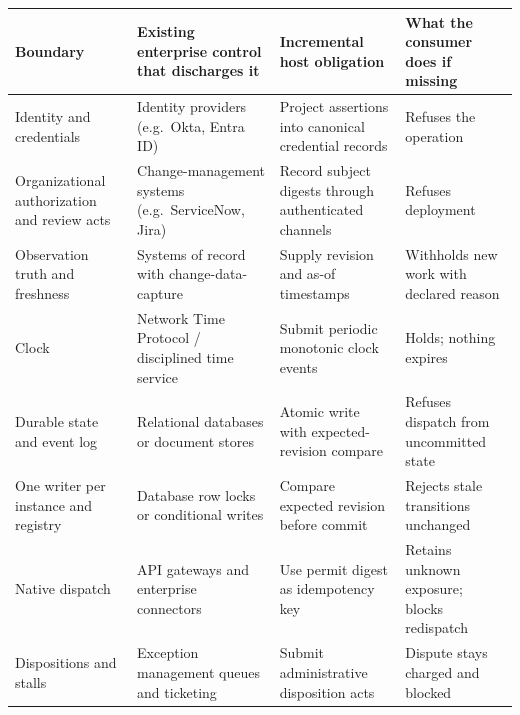 \documentclass[
  american,
  11pt,
  letterpaper,
]{article}
\newcounter{none} %
\begin{document}
{\def\LTcaptype{none} %
\begin{longtable}[]{@{}
  >{\raggedright\arraybackslash}p{}
  >{\raggedright\arraybackslash}p{}
  >{\raggedright\arraybackslash}p{}
  >{\raggedright\arraybackslash}p{}@{}}
\toprule\noalign{}
\begin{minipage}[b]{\linewidth}\raggedright
Boundary
\end{minipage} & \begin{minipage}[b]{\linewidth}\raggedright
Existing enterprise control that discharges it
\end{minipage} & \begin{minipage}[b]{\linewidth}\raggedright
Incremental host obligation
\end{minipage} & \begin{minipage}[b]{\linewidth}\raggedright
What the consumer does if missing
\end{minipage} \\
\midrule\noalign{}
\endhead
\bottomrule\noalign{}
\endlastfoot
Identity and credentials & Identity providers (e.g.~Okta, Entra ID) &
Project assertions into canonical credential records & Refuses the
operation \\
Organizational authorization and review acts & Change-management systems
(e.g.~ServiceNow, Jira) & Record subject digests through authenticated
channels & Refuses deployment \\
Observation truth and freshness & Systems of record with
change-data-capture & Supply revision and as-of timestamps & Withholds
new work with declared reason \\
Clock & Network Time Protocol / disciplined time service & Submit
periodic monotonic clock events & Holds; nothing expires \\
Durable state and event log & Relational databases or document stores &
Atomic write with expected-revision compare & Refuses dispatch from
uncommitted state \\
One writer per instance and registry & Database row locks or conditional
writes & Compare expected revision before commit & Rejects stale
transitions unchanged \\
Native dispatch & API gateways and enterprise connectors & Use permit
digest as idempotency key & Retains unknown exposure; blocks
redispatch \\
Dispositions and stalls & Exception management queues and ticketing &
Submit administrative disposition acts & Dispute stays charged and
blocked \\
\end{longtable}
}
\end{document}

